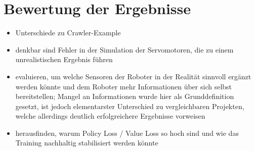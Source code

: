 \chapter{Bewertung der Ergebnisse}
\begin{itemize}
    \item Unterschiede zu Crawler-Example
    \item denkbar sind Fehler in der Simulation der Servomotoren, die zu einem unrealistischen Ergebnis führen
    \item evaluieren, um welche Sensoren der Roboter in der Realität sinnvoll ergänzt werden könnte und dem Roboter mehr Informationen über sich selbst bereitstellen; Mangel an Informationen wurde hier als Grunddefinition gesetzt, ist jedoch elementarster Unterschied zu vergleichbaren Projekten, welche allerdings deutlich erfolgreichere Ergebnisse vorweisen
    \item herausfinden, warum Policy Loss / Value Loss so hoch sind und wie das Training nachhaltig stabilisiert werden könnte
\end{itemize}